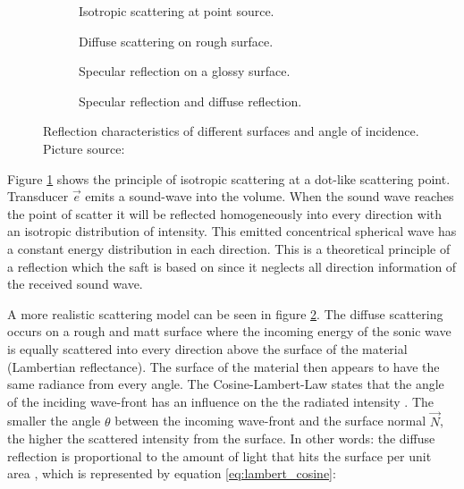 \begin{figure}[H]
     \centering
     \begin{subfigure}[b]{0.23\textwidth}
         \centering
         \caption{Isotropic scattering at point source.}
         \label{fig:reflect_isotropic}
     \end{subfigure}
     \hfill
     \begin{subfigure}[b]{0.23\textwidth}
         \centering
         \caption{Diffuse scattering on rough surface.}
         \label{fig:reflect_diffuse}
     \end{subfigure}
     \hfill
     \begin{subfigure}[b]{0.23\textwidth}
         \centering
         \caption{Specular reflection on a glossy surface.}
         \label{fig:reflect_specular}
     \end{subfigure}
     \hfill
     \begin{subfigure}[b]{0.23\textwidth}
         \centering
         \caption{Specular reflection and diffuse reflection.}
         \label{fig:reflect_mixed}
     \end{subfigure}
        \caption{Reflection characteristics of different surfaces and angle of incidence. Picture source: \cite{Kretzek2015EvaluationTomography}}
        \label{fig:types_of_reflect}
\end{figure}


Figure \ref{fig:reflect_isotropic} shows the principle of isotropic scattering at a dot-like scattering point. Transducer $\overrightarrow{e}$ emits a sound-wave into the volume. When the sound wave reaches the point of scatter it will be reflected homogeneously into every direction with an isotropic distribution of intensity. This emitted concentrical spherical wave has a constant energy distribution in each direction. This is a theoretical principle of a reflection which the \ac{saft} is based on since it neglects all direction information of the received sound wave.

A more realistic scattering model can be seen in figure \ref{fig:reflect_diffuse}. The diffuse scattering occurs on a rough and matt surface where the incoming energy of the sonic wave is equally scattered into every direction above the surface of the material (Lambertian reflectance). The surface of the material then appears to have the same radiance from every angle. The Cosine-Lambert-Law states that the angle of the inciding wave-front has an influence on the the radiated intensity \cite{lambert1892lamberts}.
The smaller the angle $\theta$ between the incoming wave-front and the surface normal $\overrightarrow{N}$, the higher the scattered intensity from the surface. In other words: the diffuse reflection is proportional to the amount of light that hits the surface per unit area \cite{illum_Phong}, which is represented by equation \ref{eq:lambert_cosine}:


